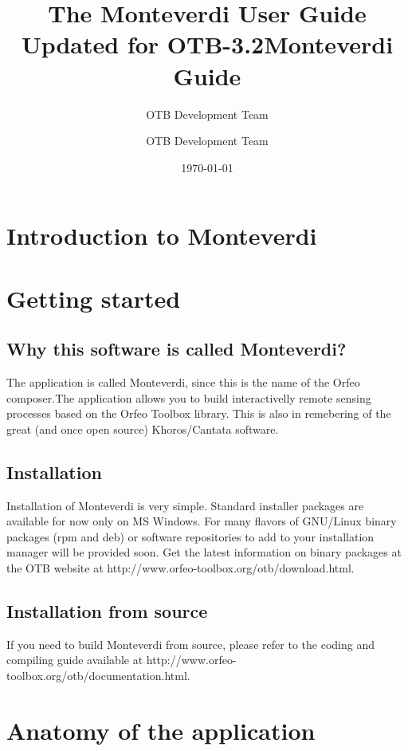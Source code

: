 \documentclass{InsightSoftwareGuide}
\title{The Monteverdi User Guide\\ Updated
  for OTB-3.2}
\author{OTB Development Team}
\date{\today}
\begin{document}
\title{Monteverdi Guide}
\author{OTB Development Team}



\tableofcontents

%

\section{Introduction to Monteverdi}
\section{Getting started}
\subsection{Why this software is called Monteverdi?}
The application is called Monteverdi, since this is the name of the Orfeo composer.The application allows you to build interactivelly remote sensing processes based on the Orfeo Toolbox library. This is also in remebering of the great (and once open source) Khoros/Cantata software.
\subsection{Installation}
Installation of Monteverdi is very simple. Standard installer packages are available for now only on MS Windows. For many flavors of GNU/Linux binary packages (rpm and deb) or software repositories
to add to your installation manager will be provided soon. Get the latest information on binary packages at
the OTB website at http://www.orfeo-toolbox.org/otb/download.html.

\subsection{Installation from source}
If you need to build Monteverdi from source, please refer to the coding and compiling guide available at
http://www.orfeo-toolbox.org/otb/documentation.html.
 
\section{Anatomy of the application}
\end{document}
